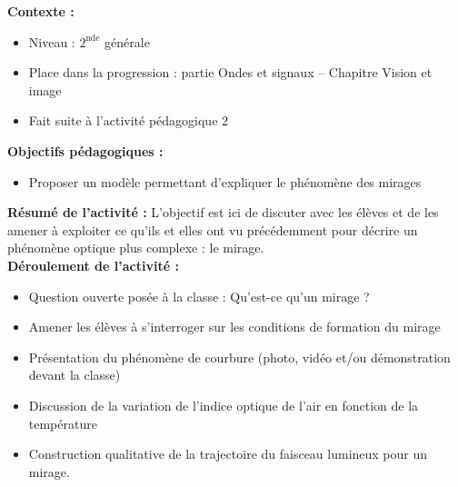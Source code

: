 \documentclass[a4paper,11pt]{article} %
\newenvironment{encart}[1]{%
	\begin{tcolorbox}
		[
		breakable, enhanced jigsaw, %
		arc = 1mm, %
		title = \textbf{#1}, %
		coltitle = white, %
		colbacktitle = blue, %
		colback = white, %
		colframe = blue %
		]
}{		
	\end{tcolorbox}
	\vspace*{0.35cm}
}
\begin{document}
	\begin{encart}{Activité pédagogique 3 : Description qualitative d'un mirage}
		\textbf{Contexte :}
		\begin{itemize}
			\item Niveau : $ 2^\text{nde} $ générale
			\item Place dans la progression : partie Ondes et signaux -- Chapitre Vision et image  
			\item Fait suite à l'activité pédagogique 2
		\end{itemize}
		\vspace{0.5cm}
		
		\textbf{Objectifs pédagogiques :}
		\begin{itemize}
			\item Proposer un modèle permettant d'expliquer le phénomène des mirages
		\end{itemize}
		\vspace{0.5cm}
		
		\textbf{Résumé de l'activité :}
		L'objectif est ici de discuter avec les élèves et de les amener à exploiter ce qu'ils et elles ont vu précédemment pour décrire un phénomène optique plus complexe : le mirage.\\
		
		\textbf{Déroulement de l'activité :}
		\begin{itemize}
			\item Question ouverte posée à la classe : \og Qu'est-ce qu'un mirage ?\fg{}
			\item Amener les élèves à s'interroger sur les conditions de formation du mirage
			\item Présentation du phénomène de courbure (photo, vidéo et/ou démonstration devant la classe)
			\item Discussion de la variation de l'indice optique de l'air en fonction de la température
			\item Construction qualitative de la trajectoire du faisceau lumineux pour un mirage.
		\end{itemize}
		
	\end{encart}
	
\end{document}
